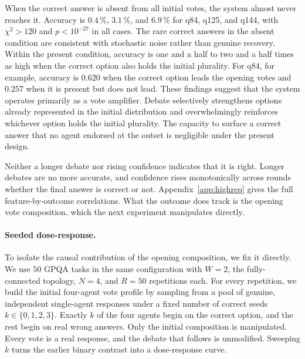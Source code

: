 When the correct answer is absent from all initial votes, the system almost never
reaches it. Accuracy is $0.4\,\%$, $3.1\,\%$, and $6.9\,\%$ for q84, q125, and
q144, with $\chi^2 > 120$ and $p < 10^{-27}$ in all cases.
The rare correct answers in the absent condition are consistent with stochastic
noise rather than genuine recovery.
Within the present condition, accuracy is one and a half to two and a half times as high when the correct
option also holds the initial plurality. For q84, for example, accuracy is $0.620$
when the correct option leads the opening votes and $0.257$ when it is present but
does not lead.
These findings suggest that the system operates primarily as a vote amplifier.
Debate selectively strengthens options already represented in the initial
distribution and overwhelmingly reinforces whichever option holds the initial
plurality. The capacity to surface a correct answer that no agent endorsed at the
outset is negligible under the present design.

Neither a longer debate nor rising confidence indicates that it is right. Longer debates are no more accurate, and confidence rises monotonically across
rounds whether the final answer is correct or not. Appendix~\ref{app:highrep} gives
the full feature-by-outcome correlations. What the outcome does track is the
opening vote composition, which the next experiment manipulates directly.

\paragraph{Seeded dose-response.}
\label{sec:results:seeded}
To isolate the causal contribution of the opening composition, we fix it directly.
We use $50$ GPQA tasks in the same configuration with $W=2$, the fully-connected
topology, $N=4$, and $R=50$ repetitions each. For every repetition, we build the
initial four-agent vote profile by sampling from a pool of genuine, independent
single-agent responses under a fixed number of correct seeds $k \in \{0,1,2,3\}$.
Exactly $k$ of the four agents begin on the correct option, and the rest begin on
real wrong answers. Only the initial composition is manipulated. Every vote is a real
response, and the debate that follows is unmodified. Sweeping $k$ turns the earlier
binary contrast into a dose-response curve.

